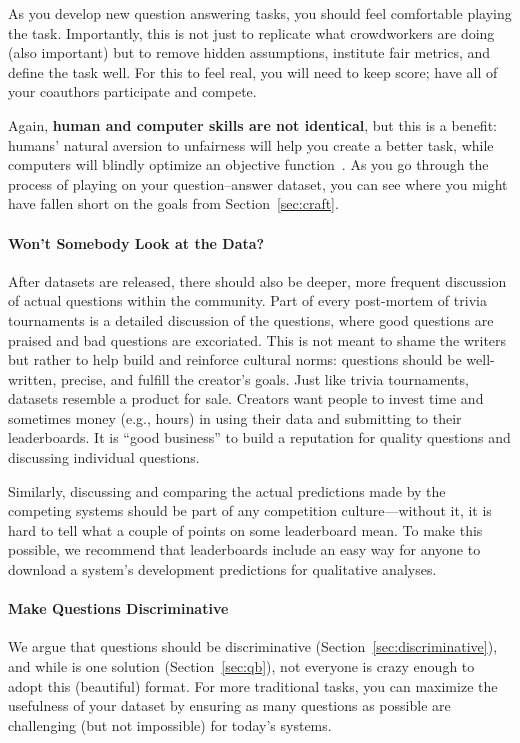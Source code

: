 As you develop new question answering tasks, you should feel comfortable playing the task.
Importantly, this is not just to replicate what crowdworkers are doing (also important) but to remove hidden assumptions, institute fair metrics, and define the task well.
For this to feel real, you will need to keep score; have all of your coauthors participate and compete.

Again, {\bf human and computer skills are not
  identical}, but this is a benefit: humans' natural aversion to
unfairness will help you create a better task, while computers will
blindly optimize an objective function~\cite{bostrom-03}.
As you go through the process of playing on your question--answer dataset, you can see where you might have fallen short on the goals from Section~\ref{sec:craft}.

\paragraph{Won't Somebody Look at the Data?}

After  datasets are released, there should also be deeper, more frequent discussion of actual questions within the  community.
Part of every post-mortem of trivia tournaments is a detailed discussion of the questions, where good questions are praised and bad questions are excoriated.
This is not meant to shame the writers but rather to help build and reinforce cultural norms: questions should be well-written, precise, and fulfill the creator's goals.
Just like trivia tournaments,  datasets resemble a product for sale.
Creators want people to invest time and sometimes money (e.g.,  hours) in using their data and submitting to their leaderboards.
It is ``good business'' to build a reputation for quality questions and discussing individual questions.

Similarly, discussing and comparing the actual predictions made by the competing systems should be part of
any competition culture---without it, it is hard to tell what a couple of points
on some leaderboard mean.  To make this possible, we recommend that leaderboards include an
easy way for anyone to download a system's development predictions for qualitative analyses.

\paragraph{Make Questions Discriminative}

We argue that questions should be discriminative (Section~\ref{sec:discriminative}), and while \qb{} is one solution (Section~\ref{sec:qb}), not everyone is crazy enough to adopt this (beautiful) format.
For more traditional  tasks, you can maximize the usefulness of your dataset by ensuring as many questions as possible are challenging (but not impossible) for today's  systems.

